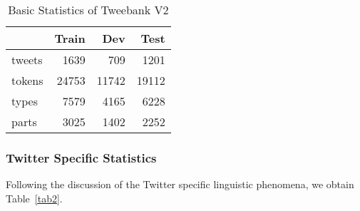 \documentclass[11pt,letterpaper]{article}
\begin{document}
\begin{table}[t]
\centering
 \begin{tabular}{l r r r} 
 \hline
 			& 	Train 		& 	Dev		&	Test\\[0.5ex] \hline
tweets 		&	1639 		&	709		&	1201\\
tokens 		&	24753		&	11742	&	19112\\
types 		&	7579			&	4165		&	6228\\
parts		 	&	3025 		&	1402		&	2252\\ \hline
\end{tabular}
 \caption{Basic Statistics of Tweebank V2}
 \label{tab1}
\end{table}

\subsubsection{Twitter Specific Statistics}\label{stats}
Following the discussion of the Twitter specific linguistic phenomena, we obtain Table~\ref{tab2}.
\end{document}
